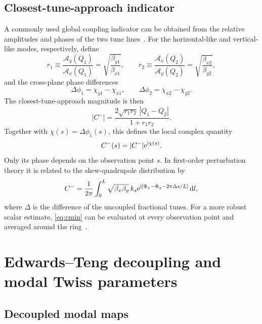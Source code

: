 \subsection{Closest-tune-approach indicator}

A commonly used global coupling indicator can be obtained from the relative
amplitudes and phases of the two tune lines~\cite{luo2004phase,Jones:2020hhl}.
For the horizontal-like and vertical-like modes, respectively, define
\begin{equation}
 r_1\equiv
 \frac{\mathcal A_y(Q_1)}{\mathcal A_x(Q_1)}
 =\sqrt{\frac{\beta_{y1}}{\beta_{x1}}},
 \qquad
 r_2\equiv
 \frac{\mathcal A_x(Q_2)}{\mathcal A_y(Q_2)}
 =\sqrt{\frac{\beta_{x2}}{\beta_{y2}}},
\end{equation}
and the cross-plane phase differences
\begin{equation}
 \Delta\phi_1=\chi_{y1}-\chi_{x1},
 \qquad
 \Delta\phi_2=\chi_{x2}-\chi_{y2}.
\end{equation}
The closest-tune-approach magnitude is then~\cite{Jones:2020hhl}
\begin{equation}
 \left|C^-\right|
 =\frac{2\sqrt{r_1r_2}\,|Q_1-Q_2|}{1+r_1r_2}.
 \label{eq:cmin}
\end{equation}
Together with $\chi(s)=\Delta\phi_1(s)$, this defines the local complex
quantity
\begin{equation}
 C^-(s)=|C^-|\mathrm{e}^{\mathrm{i}\chi(s)}.
\end{equation}
Only its phase depends on the observation point $s$.  In first-order
perturbation theory it is related to the skew-quadrupole distribution by
\begin{equation}
 C^-=\frac{1}{2\pi}\int_0^L
 \sqrt{\beta_x\beta_y}\,k_s
 \mathrm{e}^{\mathrm{i}[\Phi_x-\Phi_y-2\pi\Delta s/L]}\,\text{d} l,
\end{equation}
where $\Delta$ is the difference of the uncoupled fractional tunes.  For a
more robust scalar estimate, \cref{eq:cmin} can be evaluated at every
observation point and averaged around the ring~\cite{tobias_coupling_note}.

\section{Edwards--Teng decoupling and modal Twiss parameters}
\label{sec:et-twiss}

\subsection{Decoupled modal maps}

